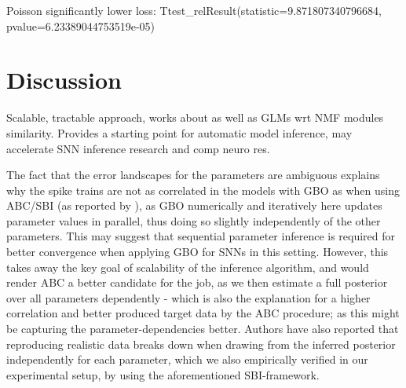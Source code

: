 \documentclass[mphil,deptreport,ianc]{infthesis} %
\begin{document}

Poisson significantly lower loss: Ttest\_relResult(statistic=9.871807340796684, pvalue=6.23389044753519e-05)


\section{Discussion}


Scalable, tractable approach, works about as well as GLMs wrt NMF modules similarity.
Provides a starting point for automatic model inference, may accelerate SNN inference research and comp neuro res.

The fact that the error landscapes for the parameters are ambiguous explains why the spike trains are not as correlated in the models with GBO as when using ABC/SBI (as reported by \cite{Rene2020}), as GBO numerically and iteratively here updates parameter values in parallel, thus doing so slightly independently of the other parameters. 
This may suggest that sequential parameter inference is required for better convergence when applying GBO for SNNs in this setting.
However, this takes away the key goal of scalability of the inference algorithm, and would render ABC a better candidate for the job, as we then estimate a full posterior over all parameters dependently - which is also the explanation for a higher correlation and better produced target data by the ABC procedure; as this might be capturing the parameter-dependencies better.
Authors have also reported that reproducing realistic data breaks down when drawing from the inferred posterior independently for each parameter, which we also empirically verified in our experimental setup, by using the aforementioned SBI-framework.


\end{document}
